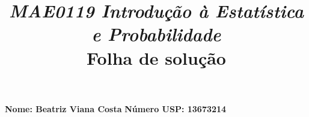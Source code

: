 \documentclass[11pt,reqno,a4paper]{amsart}
\begin{document}
\parindent=0pt

\title{\textsl{MAE0119 Introdução à Estatística e Probabilidade}\\\vspace{3\jot}
  Folha de solução}
\author[Folha para entrega da segunda lista]{}

\maketitle
\thispagestyle{empty} 
\pagestyle{plain}
\onehalfspace

\textbf{Nome: Beatriz Viana Costa}\hfill
\textbf{Número USP: 13673214}\hspace{3cm}\null

\medskip
{}

\endgroup
\end{document}
